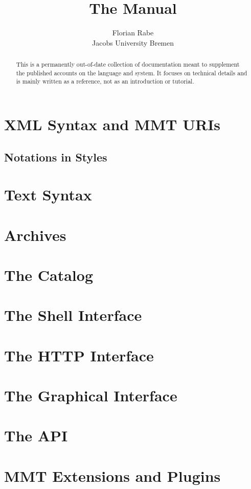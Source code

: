 \documentclass{article}
\title{The {\mmt} Manual}
\author{Florian Rabe \\
Jacobs University Bremen}
\begin{document}
\maketitle

\begin{abstract}
This is a permanently out-of-date collection of documentation meant to supplement the published accounts on the \mmt language and system.
It focuses on technical details and is mainly written as a reference, not as an introduction or tutorial.
\end{abstract}

\section{XML Syntax and MMT URIs}\label{sec:syntax}
  

\subsection{Notations in Styles}\label{sec:notations}
  

\section{Text Syntax}\label{sec:syntax}
  

\section{Archives}\label{sec:archives}
  

\section{The Catalog}\label{sec:catalog}
  

\section{The Shell Interface}\label{sec:shell}
  

\section{The HTTP Interface}\label{sec:http}
  

\section{The Graphical Interface}\label{sec:gui}
  

\section{The API}
  

\section{MMT Extensions and Plugins}\label{sec:extensions}
  




\end{document}

